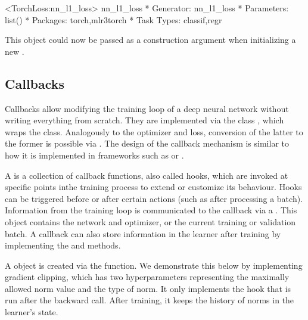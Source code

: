 \documentclass[article]{jss}
\theoremstyle{definition}
\begin{document}
\begin{CodeOutput}
<TorchLoss:nn_l1_loss> nn_l1_loss
* Generator: nn_l1_loss
* Parameters: list()
* Packages: torch,mlr3torch
* Task Types: classif,regr
\end{CodeOutput}

This object could now be passed as a construction argument  when initializing a new .

\subsection{Callbacks}\label{sec:extending-callbacks}

Callbacks allow modifying the training loop of a deep neural network without writing everything from scratch.
They are implemented via the  class , which wraps the  class.
Analogously to the optimizer and loss, conversion of the latter to the former is possible via .
The design of the callback mechanism is similar to how it is implemented in frameworks such as \keras{} or \luz{} \citep{ref-chollet2018keras, ref-luz2023}.

A  is a collection of callback functions, also called hooks, which are invoked at specific points inthe training process to extend or customize its behaviour.
Hooks can be triggered before or after certain actions (such as after processing a batch).
Information from the training loop is communicated to the callback via a .
This object contains the network and optimizer, or the current training or validation batch.
A callback can also store information in the learner after training by implementing the  and  methods.

A  object is created via the  function.
We demonstrate this below by implementing gradient clipping, which has two hyperparameters representing the maximally allowed norm value and the type of norm.
It only implements the hook that is run after the backward call.
After training, it keeps the history of norms in the learner's state.
\end{document}
